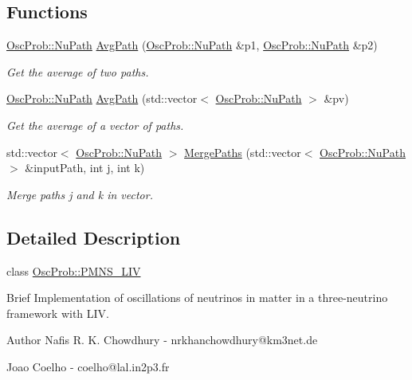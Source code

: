\subsection*{Functions}
\begin{DoxyCompactItemize}
\item 
\hyperlink{structOscProb_1_1NuPath}{Osc\+Prob\+::\+Nu\+Path} \hyperlink{namespaceOscProb_a999a7944bad8bc72d7ee9f56f81a210e}{Avg\+Path} (\hyperlink{structOscProb_1_1NuPath}{Osc\+Prob\+::\+Nu\+Path} \&p1, \hyperlink{structOscProb_1_1NuPath}{Osc\+Prob\+::\+Nu\+Path} \&p2)
\begin{DoxyCompactList}\small\item\em Get the average of two paths. \end{DoxyCompactList}\item 
\hyperlink{structOscProb_1_1NuPath}{Osc\+Prob\+::\+Nu\+Path} \hyperlink{namespaceOscProb_a68e2c991fb8e0e76833482be455a55ee}{Avg\+Path} (std\+::vector$<$ \hyperlink{structOscProb_1_1NuPath}{Osc\+Prob\+::\+Nu\+Path} $>$ \&pv)
\begin{DoxyCompactList}\small\item\em Get the average of a vector of paths. \end{DoxyCompactList}\item 
std\+::vector$<$ \hyperlink{structOscProb_1_1NuPath}{Osc\+Prob\+::\+Nu\+Path} $>$ \hyperlink{namespaceOscProb_a7c203d8583a34acf2ae90185ba45f866}{Merge\+Paths} (std\+::vector$<$ \hyperlink{structOscProb_1_1NuPath}{Osc\+Prob\+::\+Nu\+Path} $>$ \&input\+Path, int j, int k)
\begin{DoxyCompactList}\small\item\em Merge paths j and k in vector. \end{DoxyCompactList}\end{DoxyCompactItemize}


\subsection{Detailed Description}
class \hyperlink{classOscProb_1_1PMNS__LIV}{Osc\+Prob\+::\+P\+M\+N\+S\+\_\+\+L\+IV}

Brief Implementation of oscillations of neutrinos in matter in a three-\/neutrino framework with L\+IV.

\begin{DoxyAuthor}{Author}
Nafis R. K. Chowdhury -\/ nrkhanchowdhury@km3net.\+de 

Joao Coelho -\/ coelho@lal.\+in2p3.\+fr 
\end{DoxyAuthor}


